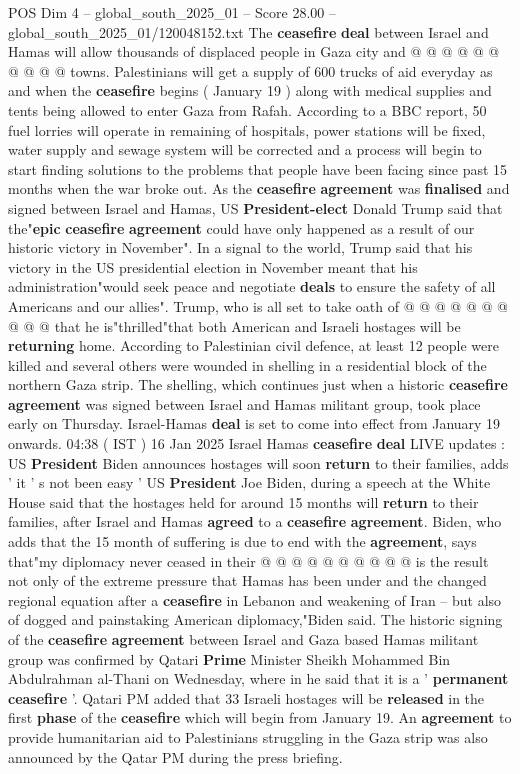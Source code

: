 \begin{textsample}{POS Dim 4 – global\_south\_2025\_01 – Score 28.00 – global\_south\_2025\_01/120048152.txt}
The \textbf{ceasefire} \textbf{deal} between Israel and Hamas will allow thousands of displaced people in Gaza city and @ @ @ @ @ @ @ @ @ @ towns.
Palestinians will get a supply of 600 trucks of aid everyday as and when the \textbf{ceasefire} begins ( January 19 ) along with medical supplies and tents being allowed to enter Gaza from Rafah.
According to a BBC report, 50 fuel lorries will operate in remaining of hospitals, power stations will be fixed, water supply and sewage system will be corrected and a process will begin to start finding solutions to the problems that people have been facing since past 15 months when the war broke out.
As the \textbf{ceasefire} \textbf{agreement} was \textbf{finalised} and signed between Israel and Hamas, US \textbf{President-elect} Donald Trump said that the"\textbf{epic} \textbf{ceasefire} \textbf{agreement} could have only happened as a result of our historic victory in November".
In a signal to the world, Trump said that his victory in the US presidential election in November meant that his administration"would seek peace and negotiate \textbf{deals} to ensure the safety of all Americans and our allies".
Trump, who is all set to take oath of @ @ @ @ @ @ @ @ @ @ that he is"thrilled"that both American and Israeli hostages will be \textbf{returning} home.
According to Palestinian civil defence, at least 12 people were killed and several others were wounded in shelling in a residential block of the northern Gaza strip.
The shelling, which continues just when a historic \textbf{ceasefire} \textbf{agreement} was signed between Israel and Hamas militant group, took place early on Thursday.
Israel-Hamas \textbf{deal} is set to come into effect from January 19 onwards. 04:38 ( IST ) 16 Jan 2025 Israel Hamas \textbf{ceasefire} \textbf{deal} LIVE updates : US \textbf{President} Biden announces hostages will soon \textbf{return} to their families, adds ' it ' s not been easy ' US \textbf{President} Joe Biden, during a speech at the White House said that the hostages held for around 15 months will \textbf{return} to their families, after Israel and Hamas \textbf{agreed} to a \textbf{ceasefire} \textbf{agreement}.
Biden, who adds that the 15 month of suffering is due to end with the \textbf{agreement}, says that"my diplomacy never ceased in their @ @ @ @ @ @ @ @ @ @ is the result not only of the extreme pressure that Hamas has been under and the changed regional equation after a \textbf{ceasefire} in Lebanon and weakening of Iran -- but also of dogged and painstaking American diplomacy,"Biden said.
The historic signing of the \textbf{ceasefire} \textbf{agreement} between Israel and Gaza based Hamas militant group was confirmed by Qatari \textbf{Prime} Minister Sheikh Mohammed Bin Abdulrahman al-Thani on Wednesday, where in he said that it is a ' \textbf{permanent} \textbf{ceasefire} '.
Qatari PM added that 33 Israeli hostages will be \textbf{released} in the first \textbf{phase} of the \textbf{ceasefire} which will begin from January 19.
An \textbf{agreement} to provide humanitarian aid to Palestinians struggling in the Gaza strip was also announced by the Qatar PM during the press briefing.


\end{textsample}
